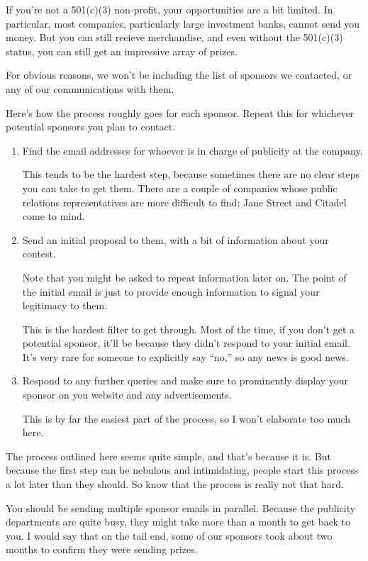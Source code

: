 \documentclass[points=false]{bounce}
\begin{document}
If you're not a 501(c)(3) non-profit, your opportunities are a bit limited. In particular, most companies, particularly large investment banks, cannot send you money. But you can still recieve merchandise, and even without the 501(c)(3) status, you can still get an impressive array of prizes.

For obvious reasons, we won't be including the list of sponsors we contacted,
or any of our communications with them.

Here's how the process roughly goes for each sponsor. Repeat this for whichever potential sponsors you plan to contact.
\begin{enumerate}
	\item Find the email addresses for whoever is in charge of publicity at the company.
	
	This tends to be the hardest step, because sometimes there are no clear steps you can take to get them. There are a couple of companies whose public relations representatives are more difficult to find; Jane Street and Citadel come to mind.

	\item Send an initial proposal to them, with a bit of information about your contest.

	Note that you might be asked to repeat information later on.
	The point of the initial email is just to provide enough information
	to signal your legitimacy to them.

	This is the hardest filter to get through.
	Most of the time, if you don't get a potential sponsor,
	it'll be because they didn't respond to your initial email.
	It's very rare for someone to explicitly say ``no,''
	so any news is good news.

	\item Respond to any further queries and make sure to prominently display your sponsor on you website and any advertisements.

	This is by far the easiest part of the process, so I won't elaborate too much here.

\end{enumerate}

The process outlined here seems quite simple, and that's because it is.
But because the first step can be nebulous and intimidating,
people start this process a lot later than they should.
So know that the process is really not that hard.

You should be sending multiple sponsor emails in parallel. Because the publicity departments are quite busy, they might take more than a month to get back to you. I would say that on the tail end, some of our sponsors took about two months to confirm they were sending prizes.
\end{document}

